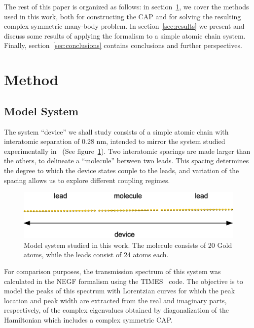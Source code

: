The rest of this paper is organized as follows: in section~\ref{sec:method}, we
cover the methods used in this work, both for constructing the \ac{CAP} and for
solving the resulting complex symmetric many-body problem. In
section~\ref{sec:results} we present and discuss some results of applying the
formalism to a simple atomic chain system. Finally,
section~\ref{sec:conclusions} contains conclusions and further perspectives.


\section{Method}
\label{sec:method}

\subsection{Model System}
\label{subsec:modelsystem}

The system ``device'' we shall study consists of a simple atomic chain with
interatomic separation of 0.28 nm, intended to mirror the system studied
experimentally in~\cite{nilius2002science} (See
figure~\ref{fig:chaincapdevice}). Two interatomic spacings are made larger than
the others, to delineate a ``molecule'' between two leads. This spacing
determines the degree to which the device states couple to the leads, and
variation of the spacing allows us to explore different coupling regimes.

\begin{figure}
	\begin{center}
		\includegraphics[width=0.9\linewidth]{figures/chaincapdevice}
	\end{center}
	\caption{Model system studied in this work. The molecule consists of 20
	Gold atoms, while the leads consist of 24 atoms each.}
	\label{fig:chaincapdevice}
\end{figure}

For comparison purposes, the transmission spectrum of this system was
calculated in the \ac{NEGF} formalism using the TIMES~\cite{times} code. The
objective is to model the peaks of this spectrum with Lorentzian curves for
which the peak location and peak width are extracted from the real and
imaginary parts, respectively, of the complex eigenvalues obtained by
diagonalization of the Hamiltonian which includes a complex symmetric \ac{CAP}.

